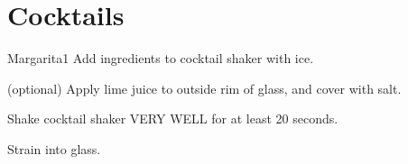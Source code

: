 \documentclass[]{article}
\begin{document}
\tableofcontents
\newpage

\section{Cocktails}

\begin{recipe}{Margarita}{1}{}
  Add ingredients to cocktail shaker with ice.

  (optional) Apply lime juice to outside rim of glass, and cover with salt.

  \newstep
  Shake cocktail shaker VERY WELL for at least 20 seconds.

  \newstep
  Strain into glass.
\end{recipe}
\end{document}
